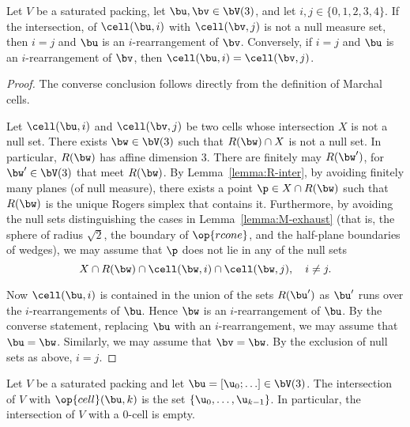 \begin{lemma}[]\label{lemma:marchal-equal} 
Let $V$ be a saturated packing, 
let $\bu,\bv\in \bV(3)$, and let $i,j\in \{0,1,2,3,4\}$.
If the intersection, of
$\cell(\bu,i)$ with $\cell(\bv,j)$ is not a null measure set,
then $i=j$ and $\bu$ is an $i$-rearrangement of $\bv$.
Conversely, if $i=j$ and $\bu$ is an $i$-rearrangement of $\bv$, 
then $\cell(\bu,i)=\cell(\bv,j)$.
\end{lemma}

\begin{proof} 
The converse conclusion follows directly from the definition of Marchal cells.

Let $\cell(\bu,i)$ and $\cell(\bv,j)$ be two cells whose intersection $X$ is
not a null set.  There exists $\bw\in \bV(3)$ such that $R(\bw)\cap X$
is not a null set.  In particular, $R(\bw)$ has affine dimension $3$.  There are finitely
may $R(\bw')$, for $\bw'\in \bV(3)$ that meet $R(\bw)$.  
By Lemma~\ref{lemma:R-inter}, by avoiding finitely many planes (of null measure),
there exists a point $\p\in X\cap R(\bw)$ such that $R(\bw)$ is the unique
Rogers simplex that contains it.  Furthermore, by avoiding the null sets distinguishing
the cases in Lemma~\ref{lemma:M-exhaust} (that is, the sphere of radius $\sqrt2$,
the boundary of $\op{rcone}$, and the half-plane boundaries of wedges), we
may assume that $\p$ does not lie in any of the null sets
\begin{displaymath} 
X\cap R(\bw)\cap\cell(\bw,i)\cap \cell(\bw,j),\quad i\ne j.
\end{displaymath} 


Now $\cell(\bu,i)$ is contained in the union of the sets $R(\bu')$ as $\bu'$ runs over the
$i$-rearrangements of $\bu$.  Hence $\bw$ is an $i$-rearrangement of
$\bu$.  By the converse statement, replacing $\bu$ with an
$i$-rearrangement, we may assume that $\bu=\bw$.  Similarly, we may
assume that $\bv=\bw$.  By the exclusion of null sets as above, $i=j$.
\end{proof}



\begin{lemma}
Let $V$ be a saturated packing and let $\bu=[\u_0;\ldots]\in \bV(3)$.
The intersection of $V$ with  $\op{cell}(\bu,k)$ is the set $\{\u_0,\ldots,\u_{k-1}\}$.
In particular, the intersection of $V$ with a $0$-cell is empty.
\end{lemma}

